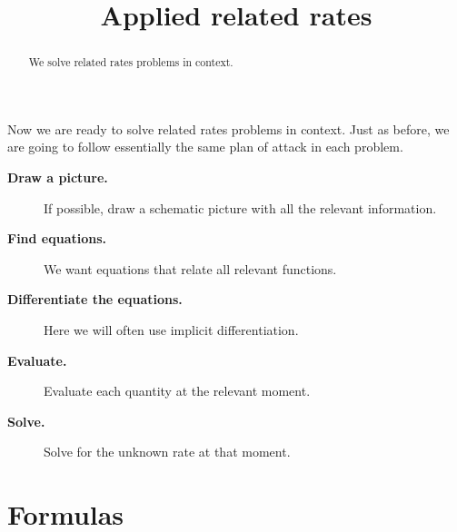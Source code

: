 \documentclass{ximera}
\title[Dig-In:]{Applied related rates}
\begin{document}
\begin{abstract}
  We solve related rates problems in context.
\end{abstract}
\maketitle

Now we are ready to solve related rates problems in context. Just as
before, we are going to follow essentially the same plan of attack in
each problem.


\begin{description}
\item[\textbf{Draw a picture.}] If possible, draw a schematic picture with all the relevant information. 
\item[\textbf{Find equations.}] We want equations that relate all
  relevant functions.
\item[\textbf{Differentiate the equations.}] Here we will often use
  implicit differentiation.
\item[\textbf{Evaluate.}] Evaluate
  each quantity at the  relevant moment.
 \item[\textbf{Solve.}] Solve
 for the unknown rate at that moment.
\end{description}



\section{Formulas}
\end{document}
